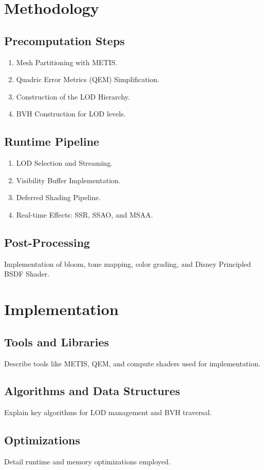 \documentclass[12pt]{extarticle}
\begin{document}
\section{Methodology}
\subsection{Precomputation Steps}
\begin{enumerate}
    \item Mesh Partitioning with METIS.
    \item Quadric Error Metrics (QEM) Simplification.
    \item Construction of the LOD Hierarchy.
    \item BVH Construction for LOD levels.
\end{enumerate}
\subsection{Runtime Pipeline}
\begin{enumerate}
    \item LOD Selection and Streaming.
    \item Visibility Buffer Implementation.
    \item Deferred Shading Pipeline.
    \item Real-time Effects: SSR, SSAO, and MSAA.
\end{enumerate}
\subsection{Post-Processing}
Implementation of bloom, tone mapping, color grading, and Disney Principled BSDF Shader.

\section{Implementation}
\subsection{Tools and Libraries}
Describe tools like METIS, QEM, and compute shaders used for implementation.
\subsection{Algorithms and Data Structures}
Explain key algorithms for LOD management and BVH traversal.
\subsection{Optimizations}
Detail runtime and memory optimizations employed.
\end{document}
